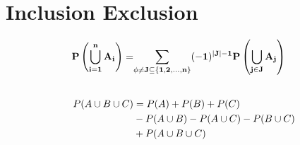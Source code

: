 \section{Inclusion Exclusion}
\begin{slide}
\begin{align*}
	\huge
	\mathbf{P\left(\bigcup_{i=1}^{n} A_i\right)} =&\mathbf{\sum_{\phi\neq J\subseteq\{1,2,\ldots,n\}} (-1)^{|J|-1}P\left(\bigcup_{j\in J}A_j\right)}\\[20pt]
	P(A\cup B\cup C) &=  P(A) + P(B) + P(C)\\
                          & - P(A\cup B) - P(A\cup C) - P(B\cup C)\\
			  & + P(A\cup B\cup C)    
\end{align*}
\end{slide}
